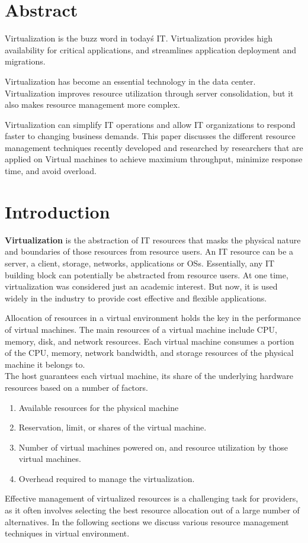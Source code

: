 \documentclass[12pt]{article} %
\begin{document}
\maketitle
\setcounter{secnumdepth}{1}
\section*{Abstract}
Virtualization is the buzz word in today\'s IT. Virtualization provides high availability for critical applications, and streamlines application deployment and migrations.

 
Virtualization has become an essential technology in the data center. Virtualization improves resource utilization through server consolidation, but it also makes resource management more complex. 


Virtualization can simplify IT operations and allow IT organizations to respond faster to changing business demands. This paper discusses the different resource management  techniques recently developed and researched by researchers that are applied on Virtual machines to achieve maximium throughput, minimize response time, and avoid overload.

\section{Introduction}


\textbf{Virtualization} is the abstraction of IT resources that masks the physical nature and boundaries of those resources from resource users. An IT resource can be a server, a client, storage, networks, applications or OSs. Essentially, any IT building block can potentially be abstracted from resource users. At one time, virtualization was considered just an academic interest. But now, it is used widely in the industry to provide cost effective and flexible applications. 


Allocation of resources in a virtual environment holds the key in the performance of virtual machines. The main  resources of a virtual machine include CPU, memory, disk, and network resources. Each virtual machine consumes a portion of the CPU, memory, network bandwidth, and storage resources of the physical machine it belongs to.\\
The host guarantees each virtual machine, its share of the underlying hardware resources based on a number of factors.
\begin{enumerate}
\item{Available resources for the physical machine}
\item{Reservation, limit, or shares of the virtual machine.}
\item{Number of virtual machines powered on, and resource utilization by those virtual
machines.}
\item{Overhead required to manage the virtualization.}
\end{enumerate}
Effective management of virtualized resources is a challenging task for providers, as it often involves selecting the best resource allocation out of a large number of alternatives. In the following sections we discuss various resource management techniques in virtual environment.
\end{document}
